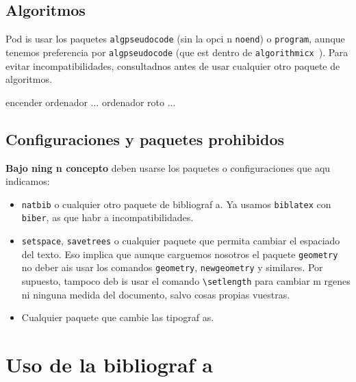 \documentclass{article}
\begin{document}
\subsection{Algoritmos}
Pod is usar los paquetes \verb+algpseudocode+ (sin la opci n \verb+noend+) o \verb+program+, aunque tenemos preferencia por \verb+algpseudocode+ (que est  dentro de \verb+algorithmicx+~\cite{algorithmicx}).
Para evitar incompatibilidades, consultadnos antes de usar cualquier otro paquete de algoritmos.

\begin{algoritmo}
\begin{algorithmic}[1]
\State encender ordenador
\State ... 
\Else
\State ordenador roto
\EndIf
\EndIf
\Else
\State ... 
\EndIf
\EndIf
\EndProcedure
\end{algorithmic}
\end{algoritmo}

\subsection{Configuraciones y paquetes prohibidos}
\textbf{Bajo ning n concepto} deben usarse los paquetes o configuraciones que aqu  indicamos:
\begin{itemize}
\item \verb+natbib+ o cualquier otro paquete de bibliograf a.
  Ya usamos \verb+biblatex+ con \verb+biber+, as  que habr a incompatibilidades.
\item \verb+setspace+, \verb+savetrees+ o cualquier paquete que permita cambiar el espaciado del texto.
  Eso implica que aunque carguemos nosotros el paquete \verb+geometry+ no deber ais usar los comandos \verb+geometry+, \verb+newgeometry+ y similares.
  Por supuesto, tampoco deb is usar el comando \verb+\setlength+ para cambiar m rgenes ni ninguna medida del documento, salvo cosas propias vuestras.
\item Cualquier paquete que cambie las tipograf as.
\end{itemize}

\section{Uso de la bibliograf a}
\end{document}
